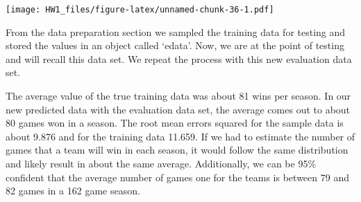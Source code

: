 \documentclass[
]{article}
\newenvironment{Shaded}{\begin{snugshade}}{\end{snugshade}}
\newcommand{\AttributeTok}[1]{\textcolor[rgb]{0.77,0.63,0.00}{#1}}
\newcommand{\DecValTok}[1]{\textcolor[rgb]{0.00,0.00,0.81}{#1}}
\newcommand{\FloatTok}[1]{\textcolor[rgb]{0.00,0.00,0.81}{#1}}
\newcommand{\FunctionTok}[1]{\textcolor[rgb]{0.00,0.00,0.00}{#1}}
\newcommand{\NormalTok}[1]{#1}
\newcommand{\OtherTok}[1]{\textcolor[rgb]{0.56,0.35,0.01}{#1}}
\newcommand{\SpecialCharTok}[1]{\textcolor[rgb]{0.00,0.00,0.00}{#1}}
\newcommand{\StringTok}[1]{\textcolor[rgb]{0.31,0.60,0.02}{#1}}
\begin{document}
\begin{Shaded}
\end{Shaded}

\texttt{[image: HW1\_files/figure-latex/unnamed-chunk-36-1.pdf]}

From the data preparation section we sampled the training data for
testing and stored the values in an object called `edata'. Now, we are
at the point of testing and will recall this data set. We repeat the
process with this new evaluation data set.

The average value of the true training data was about 81 wins per
season. In our new predicted data with the evaluation data set, the
average comes out to about 80 games won in a season. The root mean
errors squared for the sample data is about 9.876 and for the training
data 11.659. If we had to estimate the number of games that a team will
win in each season, it would follow the same distribution and likely
result in about the same average. Additionally, we can be 95\% confident
that the average number of games one for the teams is between 79 and 82
games in a 162 game season.
\end{document}
